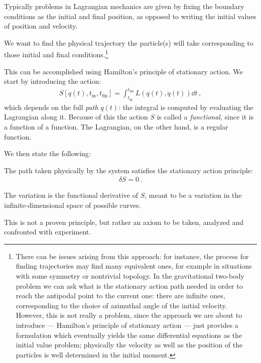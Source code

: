 \documentclass[main.tex]{subfiles}
\begin{document}
Typically problems in Lagrangian mechanics are given by fixing the boundary conditions as the initial and final position, as opposed to writing the initial values of position and velocity. 

We want to find the physical trajectory the particle(s) will take corresponding to those initial and final conditions.\footnote{There can be issues arising from this approach: for instance, the process for finding trajectories may find many equivalent ones, for example in situations with some symmetry or nontrivial topology.
In the gravitational two-body problem we can ask what is the stationary action path needed in order to reach the antipodal point to the current one: there are infinite ones, corresponding to the choice of azimuthal angle of the initial velocity.
However, this is not really a problem, since the approach we are about to introduce --- Hamilton's principle of stationary action --- just provides a formulation which eventually yields the same differential equations as the initial value problem; physically the velocity as well as the position of the particles is well determined in the initial moment.}

This can be accomplished using Hamilton's principle of stationary action. We start by introducing the action: 
%
\begin{align}
S[q(t), t _{\text{in}}, t _{\text{fin}}] = \int_{t _{\text{in}}}^{t _{\text{fin}}} L(q(t), \dot{q}(t)) \dd{t}
\,,
\end{align}
%
which depends on the full \emph{path} \(q(t)\): the integral is computed by evaluating the Lagrangian along it.
Because of this the action \(S\) is called a \emph{functional}, since it is a function of a function. The Lagrangian, on the other hand, is  a regular function.

We then state the following: 
\begin{claim}
The path taken physically by the system satisfies the stationary action principle: 
%
\begin{align}
\delta S = 0
\,.
\end{align}

The variation is the functional derivative of \(S\), meant to be a variation in the infinite-dimensional space of possible curves.
\end{claim}

This is not a proven principle, but rather an axiom to be taken, analyzed and confronted with experiment. 

\end{document}

